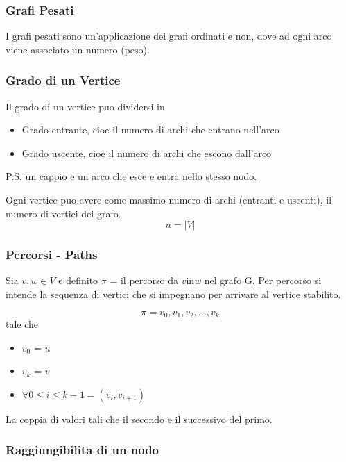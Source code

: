 \subsubsection{Grafi Pesati}
I grafi pesati sono un'applicazione dei grafi ordinati e non, dove ad ogni arco viene associato un numero (peso).

\subsubsection{Grado di un Vertice}

Il grado di un vertice puo dividersi in 
\begin{itemize}
	\item Grado entrante, cioe il numero di archi che entrano nell'arco
	\item Grado uscente, cioe il numero di archi che escono dall'arco
\end{itemize}

P.S. un cappio e un arco che esce e entra nello stesso nodo.

Ogni vertice puo avere come massimo numero di archi (entranti e uscenti), il numero di vertici del grafo.
$$n = |V|$$

\subsubsection{Percorsi - Paths}
Sia $v,w \in V$ e definito $\pi$ = il percorso da $v \text{in} w$ nel grafo G. Per percorso si intende la sequenza di vertici che si impegnano per arrivare al vertice stabilito. 

$$\pi = v_0,v_1,v_2,\dots,v_k$$ tale che 

\begin{itemize}
	\item $v_0$ = $u$
	\item $v_k$ = $v$
	\item $\forall 0\le i \le k-1 = (v_i,v_{i+1})$
\end{itemize}

La coppia di valori tali che il secondo e il successivo del primo.

\subsubsection{Raggiungibilita di un nodo}






